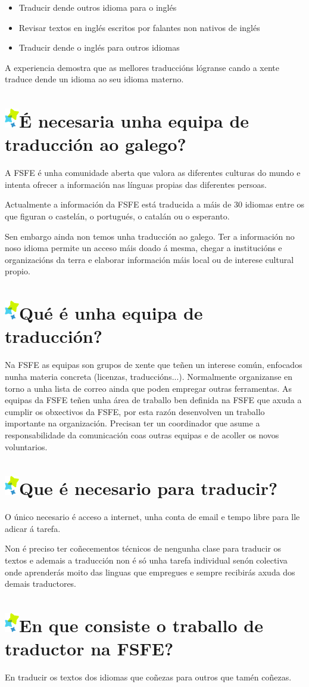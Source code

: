 \documentclass[10pt,foldmark,tumble]{leaflet}
\newcommand{\tit}[1]{\section{\includegraphics{item.png}#1}}
\begin{document}
\begin{itemize}
    \item Traducir dende outros idioma para o inglés
    \item Revisar textos en inglés escritos por falantes non nativos de inglés
    \item Traducir dende o inglés para outros idiomas
\end{itemize}

A experiencia demostra que as mellores traduccións lógranse cando a xente traduce dende un idioma ao seu idioma materno. 

\tit{É necesaria unha equipa de traducción ao galego?}
A FSFE é unha comunidade aberta que valora as diferentes culturas do mundo e intenta ofrecer a información nas línguas propias das diferentes persoas.

Actualmente a información da FSFE está traducida a máis de 30 idiomas entre os que figuran o castelán, o portugués, o catalán ou o esperanto.

Sen embargo ainda non temos unha traducción ao galego. Ter a información no noso idioma permite un acceso máis doado á mesma, chegar a institucións e organizacións da terra e elaborar información máis local ou de interese cultural propio.

\tit{Qué é unha equipa de traducción?}

 Na FSFE as equipas son grupos de xente que teñen un interese común, enfocados nunha materia concreta (licenzas, traduccións...). Normalmente organizanse en torno a unha lista de correo ainda que poden empregar outras ferramentas. As equipas da FSFE teñen unha área de traballo ben definida na FSFE que axuda a cumplir os obxectivos da FSFE, por esta razón desenvolven un traballo importante na organización. Precisan ter un coordinador que asume a responsabilidade da comunicación coas outras equipas e de acoller os novos voluntarios.
 
\tit{Que é necesario para traducir?}

O único necesario é acceso a internet, unha conta de email e tempo libre para lle adicar á tarefa.

Non é preciso ter coñecementos técnicos de nengunha clase para traducir os textos e ademais a traducción non é só unha tarefa individual senón colectiva onde aprenderás moito das linguas que empregues e sempre recibirás axuda dos demais traductores.

\tit{En que consiste o traballo de traductor na FSFE?}

En traducir os textos dos idiomas que coñezas para outros que tamén coñezas. 
\end{document}
